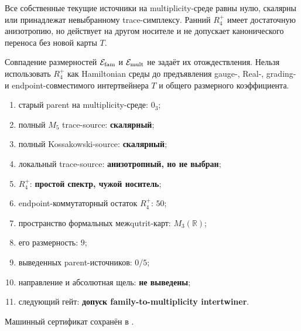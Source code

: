 \begin{theorem}
Все собственные текущие источники на multiplicity-среде равны нулю,
скалярны или принадлежат невыбранному trace-симплексу. Ранний $R_4^+$ имеет
достаточную анизотропию, но действует на другом носителе и не допускает
канонического переноса без новой карты $T$.
\end{theorem}

\begin{nogocriterion}
Совпадение размерностей $\mathcal E_{\rm fam}$ и $\mathcal E_{\rm mult}$
не задаёт их отождествления. Нельзя использовать $R_4^+$ как Hamiltonian
среды до предъявления gauge-, Real-, grading- и endpoint-совместимого
интертвейнера $T$ и общего размерного коэффициента.
\end{nogocriterion}

\begin{protocol}\begin{enumerate}
\item старый parent на multiplicity-среде: \textbf{$0_3$};
\item полный $M_5$ trace-source: \textbf{скалярный};
\item полный Kossakowski-source: \textbf{скалярный};
\item локальный trace-source: \textbf{анизотропный, но не выбран};
\item $R_4^+$: \textbf{простой спектр, чужой носитель};
\item endpoint-коммутаторный остаток $R_4^+$: \textbf{$50$};
\item пространство формальных межqutrit-карт: \textbf{$M_3(\mathbb R)$};
\item его размерность: \textbf{$9$};
\item выведенных parent-источников: \textbf{$0/5$};
\item направление и абсолютная щель: \textbf{не выведены};
\item следующий гейт: \textbf{допуск family-to-multiplicity intertwiner}.
\end{enumerate}\end{protocol}

Машинный сертификат сохранён в
.